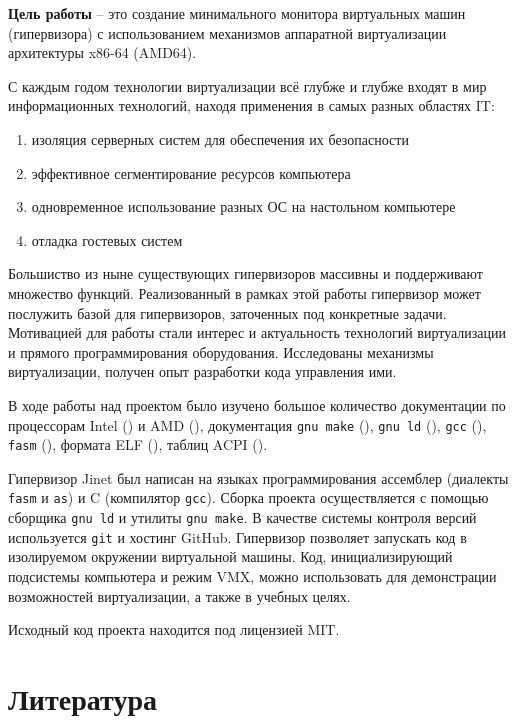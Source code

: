 \documentclass[a4paper,12pt]{extarticle}
\begin{document}
	\setlength{\parskip}{0.5em}
	\textbf{Цель работы} -- это создание минимального монитора виртуальных машин (гипервизора) с использованием механизмов аппаратной виртуализации архитектуры x86-64 (AMD64). \\\par
	С каждым годом технологии виртуализации всё глубже и глубже входят в мир информационных технологий, находя применения в самых разных областях IT:
	\begin{enumerate}
		\item изоляция серверных систем для обеспечения их безопасности
		\item эффективное сегментирование ресурсов компьютера
		\item одновременное использование разных ОС на настольном компьютере
		\item отладка гостевых систем 
	\end{enumerate}
	\par Большиство из ныне существующих гипервизоров массивны и поддерживают множество функций. Реализованный в рамках этой работы гипервизор может послужить базой для гипервизоров, заточенных под конкретные задачи. Мотивацией для работы стали интерес и актуальность технологий виртуализации и прямого программирования оборудования. Исследованы механизмы виртуализации, получен опыт разработки кода управления ими. \par
	В ходе работы над проектом было изучено большое количество документации по процессорам Intel (\cite{intel}) и AMD (\cite{amd}), документация \texttt{gnu make} (\cite{make}), \texttt{gnu ld} (\cite{ld}), \texttt{gcc} (\cite{gcc}), \texttt{fasm} (\cite{fasm}), формата ELF (\cite{elf}), таблиц ACPI (\cite{acpi}).\par
	Гипервизор Jinet был написан на языках программирования ассемблер (диалекты \texttt{fasm} и \texttt{as}) и C (компилятор \texttt{gcc}). Сборка проекта осуществляется с помощью сборщика \texttt{gnu ld} и утилиты \texttt{gnu make}. В качестве системы контроля версий используется \texttt{git} и хостинг GitHub. Гипервизор позволяет запускать код в изолируемом окружении виртуальной машины. Код, инициализирующий подсистемы компьютера и режим VMX, можно использовать для демонстрации возможностей виртуализации, а также в учебных целях.\par
	Исходный код проекта находится под лицензией MIT.
	\section{Литература}
	\nocite{*}
	\renewcommand{\section}[2]{}%
	
	
\end{document}
